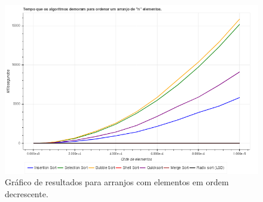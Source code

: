 \begin{figure}[H]
	\centering
	\includegraphics[scale=0.6]{img/graficos/decrescentes.png}
	\caption{Gráfico de resultados para arranjos com elementos em ordem decrescente.}
	\label{graph-decrescentes}
\end{figure}
